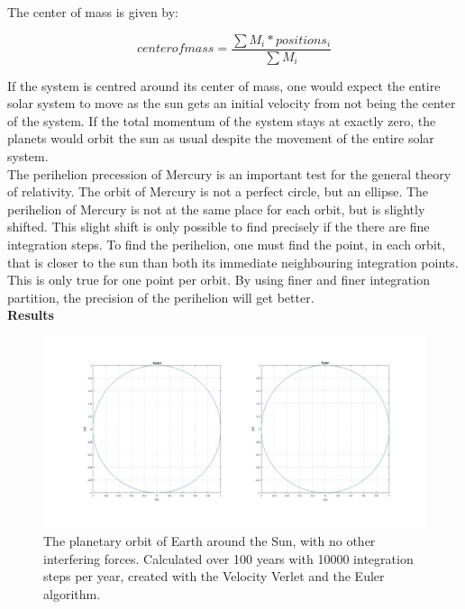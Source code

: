 \documentclass[10pt,a4paper]{article}
\begin{document}
\noindent The center of mass is given by:

$$center of mass = \frac{\sum M_i*positions_i}{\sum M_i} $$

\noindent If the system is centred around its center of mass, one would expect the entire solar system to move as the sun gets an initial velocity from not being the center of the system. If the total momentum of the system stays at exactly zero, the planets would orbit the sun as usual despite the movement of the entire solar system.\\

\noindent The perihelion precession of Mercury is an important test for the general theory of relativity. The orbit of Mercury is not a perfect circle, but an ellipse. The perihelion of Mercury is not at the same place for each orbit, but is slightly shifted. This slight shift is only possible to find precisely if the there are fine integration steps. To find the perihelion, one must find the point, in each orbit, that is closer to the sun than both its immediate neighbouring integration points. This is only true for one point per orbit. By using finer and finer integration partition, the precision of the perihelion will get better. \\  






   





\newpage
{\LARGE\bf
Results
}\\
\begin{figure} [H]  

\centerline{\includegraphics[scale=0.3]{FirstModel.jpg}}
\caption{The planetary orbit of Earth around the Sun, with no other interfering forces. Calculated over 100 years with 10000 integration steps per year, created with the Velocity Verlet and the Euler algorithm.}
\end{figure}
\end{document}
